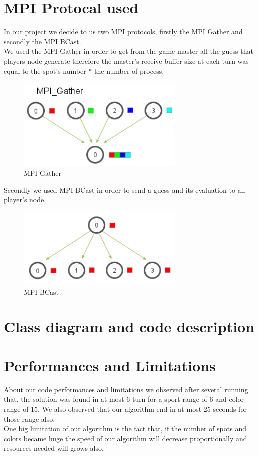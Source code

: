 \section{MPI Protocal used}
In our project we decide to us two MPI protocols, firstly the MPI Gather and secondly the MPI BCast. \\
We used the MPI Gather in order to get from the game master all the guess that players node generate therefore the master's receive buffer size at each turn  was equal to the spot's number * the number of process. 
        \begin{figure}[H]
	    \centering
	    \includegraphics[width=8cm] {gather.png}
	    \caption{MPI Gather }
	    \label{plot12}
	\end{figure}

Secondly we used MPI BCast in order to send a guess and its evaluation to all player's node.

        \begin{figure}[H]
	    \centering
	    \includegraphics[width=8cm] {bcast2.png}
	    \caption{MPI BCast  }
	    \label{plot12}
	\end{figure}

\section{Class diagram and code description}	
\section{Performances and Limitations}
About our code performances and limitations we observed after several running that, the solution was found in at most 6 turn for a sport range of 6 and color range of 15. We also observed that our algorithm end in at most 25 seconds for those range also. \\
One big limitation of our algorithm is the fact that, if the number of spots and colors became huge the speed of our algorithm will decrease proportionally and resources needed will grows also. 


